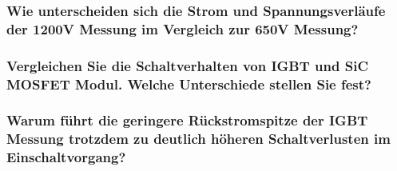 \subsubsection{Wie unterscheiden sich die Strom und Spannungsverläufe der 1200V Messung im Vergleich zur 650V Messung?}

\hrulefill

\hrulefill

\subsubsection{Vergleichen Sie die Schaltverhalten von IGBT und SiC MOSFET Modul. Welche Unterschiede stellen Sie fest?}

\hrulefill

\hrulefill


\subsubsection{Warum führt die geringere Rückstromspitze der IGBT Messung trotzdem zu deutlich höheren Schaltverlusten im Einschaltvorgang?}
\hrulefill

\hrulefill

